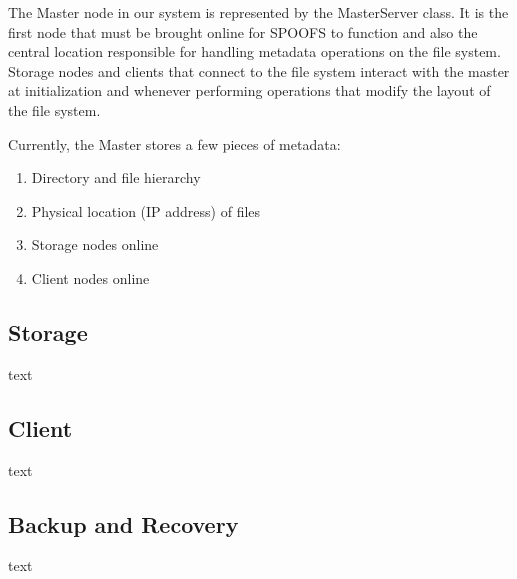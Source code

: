 The Master node in our system is represented by the MasterServer class. It is the first node that must be brought online for SPOOFS to function and also the central location responsible for handling metadata operations on the file system. Storage nodes and clients that connect to the file system interact with the master at initialization and whenever performing operations that modify the layout of the file system.

Currently, the Master stores a few pieces of metadata:
\begin{enumerate}
\item Directory and file hierarchy
\item Physical location (IP address) of files
\item Storage nodes online
\item Client nodes online
\end{enumerate}

\subsection{Storage}

text

\subsection{Client}

text

\subsection{Backup and Recovery}

text

\label{sec:spoofs}
